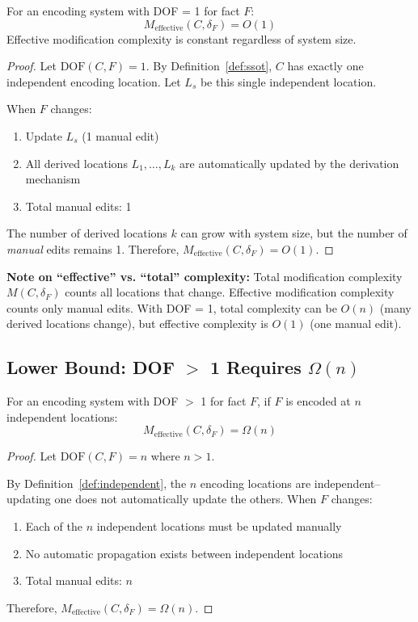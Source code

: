 \begin{theorem}[DOF = 1 Upper Bound]\label{thm:upper-bound}
For an encoding system with DOF = 1 for fact $F$:
\[
M_{\text{effective}}(C, \delta_F) = O(1)
\]
Effective modification complexity is constant regardless of system size.
\end{theorem}

\begin{proof}
Let $\text{DOF}(C, F) = 1$. By Definition~\ref{def:ssot}, $C$ has exactly one independent encoding location. Let $L_s$ be this single independent location.

When $F$ changes:
\begin{enumerate}
\tightlist
\item Update $L_s$ (1 manual edit)
\item All derived locations $L_1, \ldots, L_k$ are automatically updated by the derivation mechanism
\item Total manual edits: 1
\end{enumerate}

The number of derived locations $k$ can grow with system size, but the number of \emph{manual} edits remains 1. Therefore, $M_{\text{effective}}(C, \delta_F) = O(1)$.
\end{proof}

\textbf{Note on ``effective'' vs. ``total'' complexity:} Total modification complexity $M(C, \delta_F)$ counts all locations that change. Effective modification complexity counts only manual edits. With DOF = 1, total complexity can be $O(n)$ (many derived locations change), but effective complexity is $O(1)$ (one manual edit).

\subsection{Lower Bound: DOF $>$ 1 Requires \texorpdfstring{$\Omega(n)$}{Omega(n)}}\label{sec:lower-bound}

\begin{theorem}\label{thm:lower-bound}
For an encoding system with DOF $>$ 1 for fact $F$, if $F$ is encoded at $n$ independent locations:
\[
M_{\text{effective}}(C, \delta_F) = \Omega(n)
\]
\end{theorem}

\begin{proof}
Let $\text{DOF}(C, F) = n$ where $n > 1$.

By Definition~\ref{def:independent}, the $n$ encoding locations are independent--updating one does not automatically update the others. When $F$ changes:
\begin{enumerate}
\tightlist
\item Each of the $n$ independent locations must be updated manually
\item No automatic propagation exists between independent locations
\item Total manual edits: $n$
\end{enumerate}

Therefore, $M_{\text{effective}}(C, \delta_F) = \Omega(n)$.
\end{proof}

